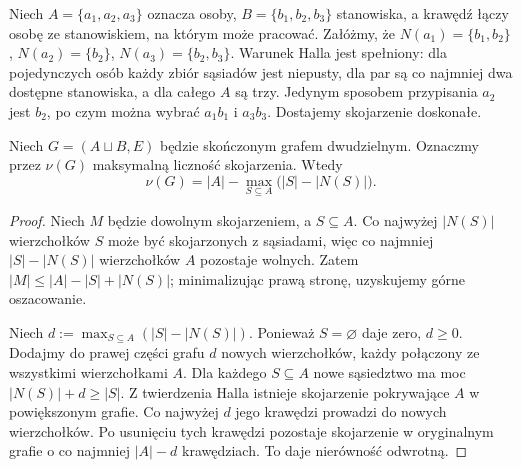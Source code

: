 \begin{przyklad}
Niech $A=\{a_1,a_2,a_3\}$ oznacza osoby,
$B=\{b_1,b_2,b_3\}$ stanowiska, a krawędź
łączy osobę ze stanowiskiem, na którym może pracować.
Załóżmy, że $N(a_1)=\{b_1,b_2\}$,
$N(a_2)=\{b_2\}$, $N(a_3)=\{b_2,b_3\}$.
Warunek Halla jest spełniony: dla pojedynczych osób
każdy zbiór sąsiadów jest niepusty, dla par są
co najmniej dwa dostępne stanowiska, a dla całego $A$
są trzy. Jedynym sposobem przypisania $a_2$ jest
$b_2$, po czym można wybrać $a_1b_1$ i $a_3b_3$.
Dostajemy skojarzenie doskonałe.
\end{przyklad}

\begin{center}
\end{center}

\begin{stwierdzenie}
\label{prop:tg-hall-def}
Niech $G=(A\sqcup B,E)$ będzie skończonym grafem
dwudzielnym. Oznaczmy przez $\nu(G)$ maksymalną
liczność skojarzenia. Wtedy
\[
\nu(G)=|A|-\max_{S\subseteq A}\bigl(|S|-|N(S)|\bigr).
\]
\end{stwierdzenie}

\begin{proof}
Niech $M$ będzie dowolnym skojarzeniem, a $S\subseteq A$.
Co najwyżej $|N(S)|$ wierzchołków $S$ może być
skojarzonych z sąsiadami, więc co najmniej
$|S|-|N(S)|$ wierzchołków $A$ pozostaje wolnych.
Zatem $|M|\le|A|-|S|+|N(S)|$; minimalizując
prawą stronę, uzyskujemy górne oszacowanie.

Niech $d:=\max_{S\subseteq A}(|S|-|N(S)|)$.
Ponieważ $S=\varnothing$ daje zero, $d\ge0$.
Dodajmy do prawej części grafu $d$ nowych
wierzchołków, każdy połączony ze wszystkimi
wierzchołkami $A$. Dla każdego $S\subseteq A$
nowe sąsiedztwo ma moc $|N(S)|+d\ge|S|$.
Z twierdzenia Halla istnieje skojarzenie
pokrywające $A$ w powiększonym grafie.
Co najwyżej $d$ jego krawędzi prowadzi do nowych
wierzchołków. Po usunięciu tych krawędzi
pozostaje skojarzenie w oryginalnym grafie
o co najmniej $|A|-d$ krawędziach.
To daje nierówność odwrotną.
\end{proof}

